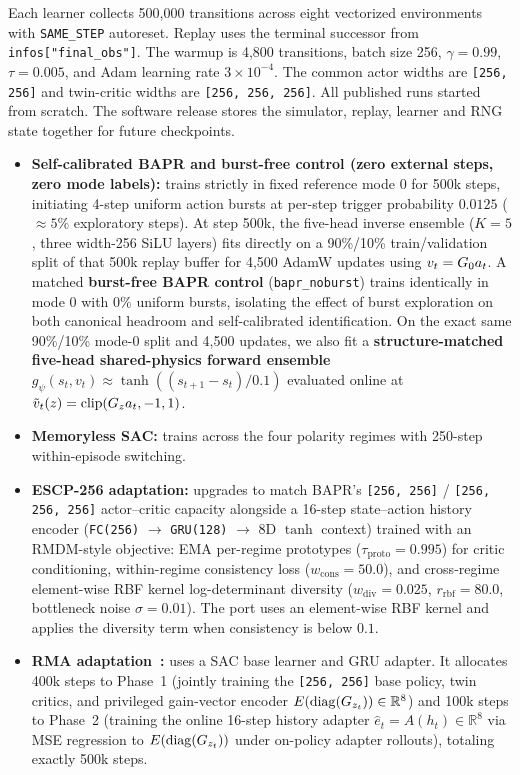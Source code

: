 Each learner collects 500,000 transitions across eight vectorized environments with \texttt{SAME\_STEP} autoreset. Replay uses the terminal successor from \texttt{infos["final\_obs"]}. The warmup is 4,800 transitions, batch size 256, $\gamma=0.99$, $\tau=0.005$, and Adam learning rate $3\times10^{-4}$. The common actor widths are \texttt{[256, 256]} and twin-critic widths are \texttt{[256, 256, 256]}. All published runs started from scratch. The software release stores the simulator, replay, learner and RNG state together for future checkpoints.
\begin{itemize}[leftmargin=*]
    \item \textbf{Self-calibrated BAPR and burst-free control (zero external steps, zero mode labels):} trains strictly in fixed reference mode 0 for 500k steps, initiating 4-step uniform action bursts at per-step trigger probability $0.0125$ ($\approx 5\%$ exploratory steps). At step 500k, the five-head inverse ensemble ($K=5$, three width-256 SiLU layers) fits directly on a 90\%/10\% train/validation split of that 500k replay buffer for 4,500 AdamW updates using $v_t=G_0 a_t$. A matched \textbf{burst-free BAPR control} (\texttt{bapr\_noburst}) trains identically in mode 0 with $0\%$ uniform bursts, isolating the effect of burst exploration on both canonical headroom and self-calibrated identification. On the exact same 90\%/10\% mode-0 split and 4,500 updates, we also fit a \textbf{structure-matched five-head shared-physics forward ensemble} $g_\psi(s_t,v_t)\approx\tanh((s_{t+1}-s_t)/0.1)$ evaluated online at $\tilde v_t(z)=\operatorname{clip}(G_z a_t,-1,1)$.
    \item \textbf{Memoryless SAC:} trains across the four polarity regimes with 250-step within-episode switching.
    \item \textbf{ESCP-256 adaptation:} upgrades \citet{Luo2022ESCP} to match BAPR's \texttt{[256, 256]} / \texttt{[256, 256, 256]} actor--critic capacity alongside a 16-step state--action history encoder (\texttt{FC(256)} $\to$ \texttt{GRU(128)} $\to$ 8D $\tanh$ context) trained with an RMDM-style objective: EMA per-regime prototypes ($\tau_{\mathrm{proto}}=0.995$) for critic conditioning, within-regime consistency loss ($w_{\mathrm{cons}}=50.0$), and cross-regime element-wise RBF kernel log-determinant diversity ($w_{\mathrm{div}}=0.025$, $r_{\mathrm{rbf}}=80.0$, bottleneck noise $\sigma=0.01$). The port uses an element-wise RBF kernel and applies the diversity term when consistency is below $0.1$.
    \item \textbf{RMA adaptation~\citep{Kumar2021RMA}:} uses a SAC base learner and GRU adapter. It allocates 400k steps to Phase~1 (jointly training the \texttt{[256, 256]} base policy, twin critics, and privileged gain-vector encoder $E(\operatorname{diag}(G_{z_t}))\in\mathbb{R}^8$) and 100k steps to Phase~2 (training the online 16-step history adapter $\hat e_t=A(h_t)\in\mathbb{R}^8$ via MSE regression to $E(\operatorname{diag}(G_{z_t}))$ under on-policy adapter rollouts), totaling exactly 500k steps.

\end{itemize}
